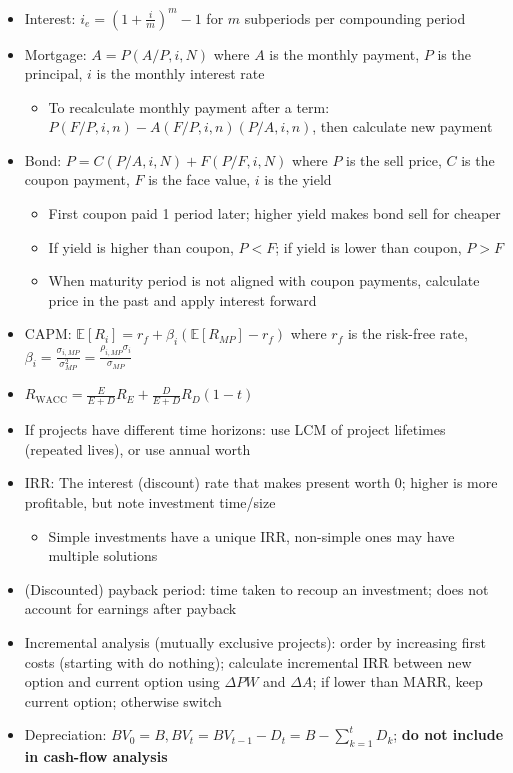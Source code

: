 \documentclass[
]{article}
\providecommand{\tightlist}{%
  \setlength{\itemsep}{0pt}\setlength{\parskip}{0pt}}
\begin{document}
\begin{itemize}
\tightlist
\item
  Interest: \(i_e = \left(1 + \frac{i}{m}\right)^m - 1\) for \(m\)
  subperiods per compounding period
\item
  Mortgage: \(A = P(A/P, i, N)\) where \(A\) is the monthly payment,
  \(P\) is the principal, \(i\) is the monthly interest rate

  \begin{itemize}
  \tightlist
  \item
    To recalculate monthly payment after a term:
    \(P(F/P, i, n) - A(F/P, i, n)(P/A, i, n)\), then calculate new
    payment
  \end{itemize}
\item
  Bond: \(P = C(P/A, i, N) + F(P/F, i, N)\) where \(P\) is the sell
  price, \(C\) is the coupon payment, \(F\) is the face value, \(i\) is
  the yield

  \begin{itemize}
  \tightlist
  \item
    First coupon paid 1 period later; higher yield makes bond sell for
    cheaper
  \item
    If yield is higher than coupon, \(P < F\); if yield is lower than
    coupon, \(P > F\)
  \item
    When maturity period is not aligned with coupon payments, calculate
    price in the past and apply interest forward
  \end{itemize}
\item
  CAPM: \(\mathbb E[R_i] = r_f + \beta _i(\mathbb E[R_{MP}] - r_f)\)
  where \(r_f\) is the risk-free rate,
  \(\displaystyle\beta _i = \frac{\sigma _{i,MP}}{\sigma _{MP}^2} = \frac{\rho _{i,MP}\sigma _i}{\sigma _{MP}}\)
\item
  \(R_\text{WACC} = \frac{E}{E + D}R_E + \frac{D}{E + D}R_D(1 - t)\)
\item
  If projects have different time horizons: use LCM of project lifetimes
  (repeated lives), or use annual worth
\item
  IRR: The interest (discount) rate that makes present worth 0; higher
  is more profitable, but note investment time/size

  \begin{itemize}
  \tightlist
  \item
    Simple investments have a unique IRR, non-simple ones may have
    multiple solutions
  \end{itemize}
\item
  (Discounted) payback period: time taken to recoup an investment; does
  not account for earnings after payback
\item
  Incremental analysis (mutually exclusive projects): order by
  increasing first costs (starting with do nothing); calculate
  incremental IRR between new option and current option using
  \(\Delta PW\) and \(\Delta A\); if lower than MARR, keep current
  option; otherwise switch
\item
  Depreciation:
  \(BV_0 = B, BV_t = BV_{t - 1} - D_t = B - \sum _{k = 1}^t D_k\);
  \textbf{do not include in cash-flow analysis}


\end{itemize}
\end{document}
